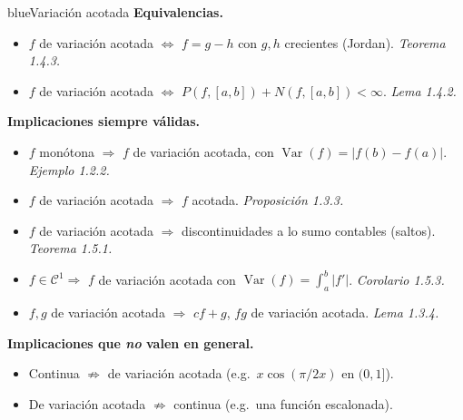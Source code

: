 \documentclass[11pt,twoside]{article}
\DeclareMathOperator{\Var}{Var}
\begin{document}
\begin{equivbox}{blue}{Variaci\'on acotada}
\textbf{Equivalencias.}
\begin{itemize}[leftmargin=2em,itemsep=2pt]
\item $f$ de variaci\'on acotada $\Leftrightarrow$ $f = g - h$ con $g, h$ crecientes (Jordan). \hfill\textit{Teorema 1.4.3.}
\item $f$ de variaci\'on acotada $\Leftrightarrow$ $P(f, [a,b]) + N(f, [a,b]) < \infty$. \hfill\textit{Lema 1.4.2.}
\end{itemize}
\textbf{Implicaciones siempre v\'alidas.}
\begin{itemize}[leftmargin=2em,itemsep=2pt]
\item $f$ mon\'otona $\Rightarrow$ $f$ de variaci\'on acotada, con $\Var(f) = |f(b) - f(a)|$. \hfill\textit{Ejemplo 1.2.2.}
\item $f$ de variaci\'on acotada $\Rightarrow$ $f$ acotada. \hfill\textit{Proposici\'on 1.3.3.}
\item $f$ de variaci\'on acotada $\Rightarrow$ discontinuidades a lo sumo contables (saltos). \hfill\textit{Teorema 1.5.1.}
\item $f \in \mathcal{C}^{1} \Rightarrow$ $f$ de variaci\'on acotada con $\Var(f) = \int_{a}^{b}|f'|$. \hfill\textit{Corolario 1.5.3.}
\item $f, g$ de variaci\'on acotada $\Rightarrow$ $cf + g$, $fg$ de variaci\'on acotada. \hfill\textit{Lema 1.3.4.}
\end{itemize}
\textbf{Implicaciones que \emph{no} valen en general.}
\begin{itemize}[leftmargin=2em,itemsep=2pt]
\item Continua $\not\Rightarrow$ de variaci\'on acotada (e.g.\ $x\cos(\pi/2x)$ en $(0,1]$).
\item De variaci\'on acotada $\not\Rightarrow$ continua (e.g.\ una funci\'on escalonada).
\end{itemize}
\end{equivbox}

\medskip
\end{document}
